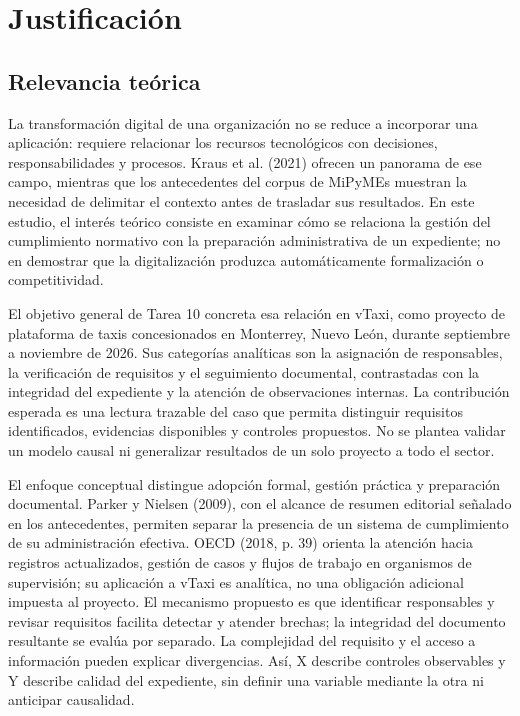 {\section{Justificación}
\subsection{Relevancia teórica}
La transformación digital de una organización no se reduce a incorporar una aplicación: requiere relacionar los recursos tecnológicos con decisiones, responsabilidades y procesos. Kraus et al. (2021) ofrecen un panorama de ese campo, mientras que los antecedentes del corpus de MiPyMEs muestran la necesidad de delimitar el contexto antes de trasladar sus resultados. En este estudio, el interés teórico consiste en examinar cómo se relaciona la gestión del cumplimiento normativo con la preparación administrativa de un expediente; no en demostrar que la digitalización produzca automáticamente formalización o competitividad.


El objetivo general de Tarea 10 concreta esa relación en vTaxi, como proyecto de plataforma de taxis concesionados en Monterrey, Nuevo León, durante septiembre a noviembre de 2026. Sus categorías analíticas son la asignación de responsables, la verificación de requisitos y el seguimiento documental, contrastadas con la integridad del expediente y la atención de observaciones internas. La contribución esperada es una lectura trazable del caso que permita distinguir requisitos identificados, evidencias disponibles y controles propuestos. No se plantea validar un modelo causal ni generalizar resultados de un solo proyecto a todo el sector.


El enfoque conceptual distingue adopción formal, gestión práctica y preparación documental. Parker y Nielsen (2009), con el alcance de resumen editorial señalado en los antecedentes, permiten separar la presencia de un sistema de cumplimiento de su administración efectiva. OECD (2018, p. 39) orienta la atención hacia registros actualizados, gestión de casos y flujos de trabajo en organismos de supervisión; su aplicación a vTaxi es analítica, no una obligación adicional impuesta al proyecto. El mecanismo propuesto es que identificar responsables y revisar requisitos facilita detectar y atender brechas; la integridad del documento resultante se evalúa por separado. La complejidad del requisito y el acceso a información pueden explicar divergencias. Así, X describe controles observables y Y describe calidad del expediente, sin definir una variable mediante la otra ni anticipar causalidad.


}
